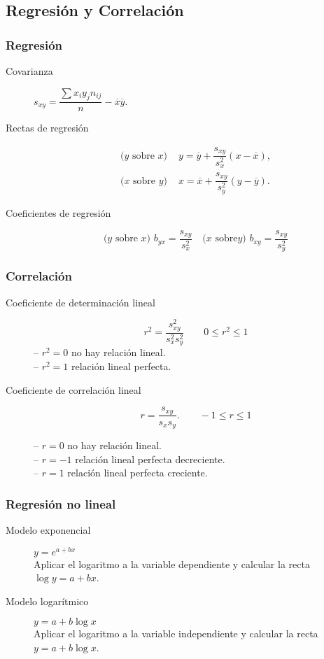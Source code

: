 \documentclass[a4paper,dvips]{article}
\newlength{\mylength}
\newenvironment{marco}{
	\setlength{\fboxsep}{5pt}
	\setlength{\mylength}{\textwidth}
	\addtolength{\mylength}{-2\fboxsep}
	\addtolength{\mylength}{-2\fboxrule}
	\noindent
	\begin{Sbox}
	\begin{minipage}{\mylength}
	\setlength{\abovedisplayskip}{3pt}
	\setlength{\belowdisplayskip}{3pt}
}
{
	\end{minipage}
	\end{Sbox}
	\fbox{\TheSbox}
}
\begin{document}
\subsection*{Regresión y Correlación}
\begin{marco}
\begin{multicols}{2}
\subsubsection*{Regresión}
\begin{description}
\item [Covarianza] $s_{xy}=\dfrac{\sum
x_iy_jn_{ij}}{n}-\overline{x}\overline{y}$.
\item [Rectas de regresión]
\begin{align*}
\textrm{($y$ sobre $x$) }&
y=\overline{y}+\dfrac{s_{xy}}{s_x^2}(x-\overline{x}),\\
\textrm{($x$ sobre $y$) }&
x=\overline{x}+\dfrac{s_{xy}}{s_y^2}(y-\overline{y}).
\end{align*}
\item [Coeficientes de regresión]
\[
\textrm{($y$ sobre $x$) } b_{yx}=\dfrac{s_{xy}}{s_x^2}\quad \textrm{($x$ sobre
$y$) } b_{xy}=\dfrac{s_{xy}}{s_y^2}
\]
\end{description}
\subsubsection*{Correlación}
\begin{description}
\item[Coeficiente de determinación lineal] \[r^2=\dfrac{s_{xy}^2}{s_x^2s_y^2} \qquad 0\leq r^2\leq 1\]
-- $r^2=0$ no hay relación lineal.\\
-- $r^2=1$ relación lineal perfecta.

\item[Coeficiente de correlación lineal] \[r=\dfrac{s_{xy}}{s_xs_y}.\qquad -1\leq r\leq 1\]

-- $r=0$ no hay relación lineal.\\
-- $r=-1$ relación lineal perfecta decreciente.\\
-- $r=1$ relación lineal perfecta creciente.
\end{description}
\subsubsection*{Regresión no lineal}
\begin{description}
  \item[Modelo exponencial] $y=e^{a+bx}$\\
  Aplicar el logaritmo a la variable dependiente y calcular la recta $\log y = a+bx$.
  \item[Modelo logarítmico] $y=a+b\log x$\\
  Aplicar el logaritmo a la variable independiente y calcular la recta $y=a+b\log x$.
\end{description}


\end{multicols}
\end{marco}
\end{document}

